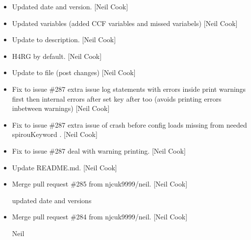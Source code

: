 \documentclass[a4paper,10pt,english]{report}
\begin{document}
\begin{itemize}
\item {} 
Updated date and version. {[}Neil Cook{]}

\item {} 
Updated variables (added CCF variables and missed 
variabels) {[}Neil Cook{]}

\item {} 
Update to  description. {[}Neil Cook{]}

\item {} 
H4RG by default. {[}Neil Cook{]}

\item {} 
Update to  file (post  changes) {[}Neil Cook{]}

\item {} 
Fix to issue \#287 \sphinxhyphen{} extra issue log statements with errors inside \sphinxhyphen{}
print warnings first then internal errors after \sphinxhyphen{} set key after too
(avoids printing errors inbetween warnings) {[}Neil Cook{]}

\item {} 
Fix to issue \#287 \sphinxhyphen{} extra issue of crash before config loads
 missing from needed spirouKeyword . {[}Neil
Cook{]}

\item {} 
Fix to issue \#287 \sphinxhyphen{} deal with  warning printing. {[}Neil
Cook{]}

\item {} 
Update README.md. {[}Neil Cook{]}

\item {} 
Merge pull request \#285 from njcuk9999/neil. {[}Neil Cook{]}

updated date and versions

\item {} 
Merge pull request \#284 from njcuk9999/neil. {[}Neil Cook{]}

Neil

\end{itemize}
\end{document}
